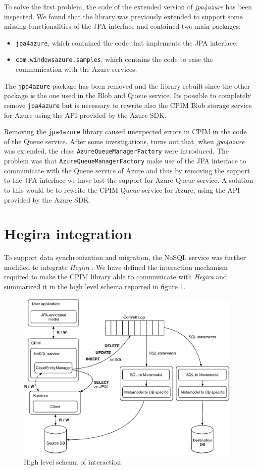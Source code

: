 \noindent To solve the first problem, the code of the extended version of \textit{jpa4azure} has been inspected. We found that the library was previously extended to support some missing functionalities of the JPA interface and contained two main packages:
\begin{itemize}
\item \texttt{jpa4azure}, which contained the code that implements the JPA interface;
\item \texttt{com.windowsazure.samples}, which contains the code to ease the communication with the Azure services.
\end{itemize}
The \texttt{jpa4azure} package has been removed and the library rebuilt since the other package is the one used in the Blob and Queue service. Its possible to completely remove \texttt{jpa4azure} but is necessary to rewrite also the CPIM Blob storage service for Azure using the API provided by the Azure SDK.

\newparagraph Removing the \texttt{jpa4azure} library caused unexpected errors in CPIM in the code of the Queue service. After some investigations, turns out that, when \textit{jpa4azure} was extended, the class \texttt{AzureQueueManagerFactory} were introduced.
The problem was that \texttt{AzureQueueManagerFactory} make use of the JPA interface to communicate with the Queue service of Azure and thus by removing the support to the JPA interface we have lost the support for Azure Queue service.
A solution to this would be to rewrite the CPIM Queue service for Azure, using the API provided by the Azure SDK.

\section{Hegira integration}
\label{sec:hegira}
To support data synchronization and migration, the NoSQL service was further modified to integrate \textit{Hegira} \cite{thesis:marco}. We have defined the interaction mechanism required to make the CPIM library able to communicate with \textit{Hegira} and summarized it in the high level schema reported in figure \ref{fig:high-level-interaction}.

\begin{figure}[tbh]
  \centering
  \includegraphics[width=11cm]{images/high_level_interaction}
  \caption{High level schema of interaction}
  \label{fig:high-level-interaction}
\end{figure} 

